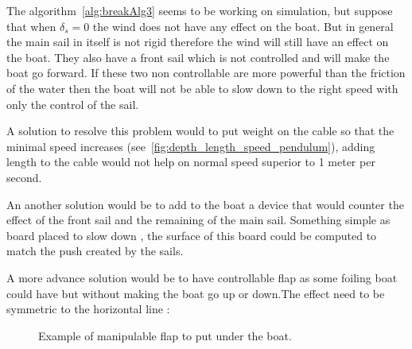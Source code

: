 The algorithm~\ref{alg:breakAlg3} seems to be working on simulation, but suppose that when $\delta_s = 0$ the wind does not have any effect on the boat. But in general the main sail in itself is not rigid therefore the wind will still have an effect on the boat. They also have a front sail which is not controlled and will make the boat go forward. If these two non controllable are more powerful than the friction of the water then the boat will not be able to slow down to the right speed with only the control of the sail.

A solution to resolve this problem would to put weight on the cable so that the minimal speed increases (see~\ref{fig:depth_length_speed_pendulum}), adding length to the cable would not help on normal speed superior to 1 meter per second.


An another solution would be to add to the boat a device that would counter the effect of the front sail and the remaining of the main sail. Something simple as board placed to slow down , the surface of this board could be computed to match the push created by the sails.
 
A more advance solution would be to have controllable flap as some foiling boat could have but without  making the boat go up or down.The effect need to be symmetric to the horizontal line :

\begin{figure}[H]
\centering
{} %
{

}
\caption*{Example of manipulable flap to put under the boat.}
\label{fig:model_boat_}
\end{figure}

